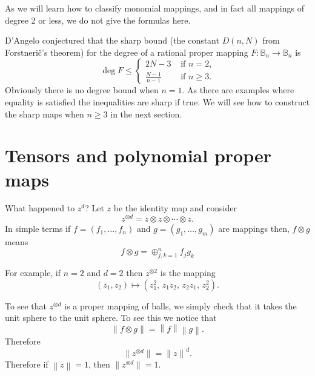 \documentclass[12pt,openany]{book}
\newcommand{\norm}[1]{\left\lVert {#1} \right\rVert}
\newcommand{\bB}{{\mathbb{B}}}
\newcommand{\sectionnewpage}{}
\theoremstyle{plain}
\theoremstyle{remark}
\theoremstyle{definition}
\theoremstyle{exercise}
\theoremstyle{example}
\begin{document}
As we will learn how to classify monomial mappings, and in fact all mappings
of degree 2 or less, we do not give the formulas here.

D'Angelo
conjectured that the sharp bound
(the constant $D(n,N)$ from Forstneri\v{c}'s theorem)
for the degree of a rational proper mapping
$F \colon \bB_n \to \bB_n$ is
\begin{equation}
\deg F \leq
\begin{cases}
2N-3 & \text{ if $n=2$,} \\
\frac{N-1}{n-1} & \text{ if $n\geq 3$.}
\end{cases}
\end{equation}
Obviously there is no degree bound when $n=1$.  As there are examples where
equality is satisfied the inequalities are sharp if true.  We will see how
to construct the sharp maps when $n \geq 3$ in the next section.


\sectionnewpage
\section{Tensors and polynomial proper maps}

What happened to $z^d$?  Let $z$ be the identity map and consider
\begin{equation}
z^{\otimes d} =  z \otimes z \otimes \cdots \otimes z .
\end{equation}
In simple terms if $f = (f_1,\ldots,f_n)$
and $g=(g_1,\ldots,g_m)$ are mappings then,
$f \otimes g$ means
\begin{equation}
f \otimes g = \oplus_{j,k=1}^n f_j g_k
\end{equation}

For example, if $n=2$ and $d=2$ then $z^{\otimes 2}$
is the mapping
\begin{equation}
(z_1,z_2) \mapsto
(z_1^2, \, z_1z_2, \, z_2z_1, \, z_2^2) .
\end{equation}

To see that $z^{\otimes d}$ is a proper mapping of balls, we simply check
that
it takes the unit sphere to the unit sphere.
To see this we notice that
\begin{equation}
\norm{ f \otimes g } =
\norm{f} \norm{g} .
\end{equation}
Therefore
\begin{equation}
\lVert z^{\otimes d} \rVert = 
{\lVert z \rVert}^d .
\end{equation}
Therefore if $\norm{z} = 1$, then 
$\lVert z^{\otimes d} \rVert = 1$.
\end{document}

